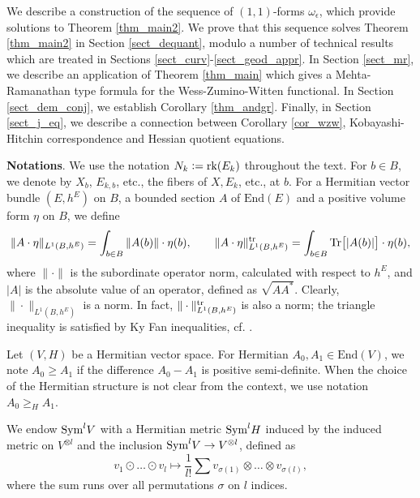 \documentclass[12pt]{article}
\numberwithin{equation}{section}
\theoremstyle{theorem}
\theoremstyle{definition}
\theoremstyle{remark}
\newcommand{\enmr}[1]{\text{End}{(#1)}}
\newcommand{\rk}[1]{{\rm{rk}} ( #1 )}
\newcommand{\tr}[1]{{\rm{Tr}} \big[ #1 \big]}
\begin{document}
	We describe a construction of the sequence of $(1, 1)$-forms $\omega_{\epsilon}$, which provide solutions to Theorem \ref{thm_main2}.
	We prove that this sequence solves Theorem \ref{thm_main2} in Section \ref{sect_dequant}, modulo a number of technical results which are treated in Sections \ref{sect_curv}-\ref{sect_geod_appr}.
	In Section \ref{sect_mr}, we describe an application of Theorem \ref{thm_main} which gives a Mehta-Ramanathan type formula for the Wess-Zumino-Witten functional.
	In Section \ref{sect_dem_conj}, we establish Corollary \ref{thm_andgr}. 
	Finally, in Section \ref{sect_j_eq}, we describe a connection between Corollary \ref{cor_wzw}, Kobayashi-Hitchin correspondence and Hessian quotient equations.
	\par 
	\textbf{Notations}. 
	We use the notation $N_k := \rk{E_k}$ throughout the text. 
	For $b \in B$, we denote by $X_b$, $E_{k, b}$, etc., the fibers of $X, E_k$, etc., at $b$. 
	For a Hermitian vector bundle $(E, h^E)$ on $B$, a bounded section $A$ of $\enmr{E}$ and a positive volume form $\eta$ on $B$, we define
	\begin{equation}
		\| A \cdot \eta \|_{L^1(B, h^E)} = \int_{b \in B} \| A(b) \| \cdot \eta(b), 
		\qquad 
		\| A \cdot \eta \|_{L^1(B, h^E)}^{{\rm{tr}}} = \int_{b \in B} \tr{|A(b)|} \cdot \eta(b),
	\end{equation}
	where $\| \cdot \|$ is the subordinate operator norm, calculated with respect to $h^E$, and $|A|$ is the absolute value of an operator, defined as $\sqrt{A A^*}$.
	Clearly, $\| \cdot \|_{L^1(B, h^E)}$ is a norm. 
	In fact, $\| \cdot \|_{L^1(B, h^E)}^{{\rm{tr}}}$ is also a norm; the triangle inequality is satisfied by Ky Fan inequalities, cf. \cite[Exercise II.1.15]{BhatiaMatr}.
	\par 
	Let $(V, H)$ be a Hermitian vector space.
	For Hermitian $A_0, A_1 \in \enmr{V}$, we note $A_0 \geq A_1$ if the difference $A_0 - A_1$ is positive semi-definite.
	When the choice of the Hermitian structure is not clear from the context, we use notation $A_0 \geq_H A_1$. 
	\par 
	We endow ${\rm{Sym}}^l V$ with a Hermitian metric ${\rm{Sym}}^l H$ induced by the induced metric on $V^{\otimes l}$ and the inclusion ${\rm{Sym}}^l V \to V^{\otimes l}$, defined as
	\begin{equation}\label{eq_sym_emb_tens}
		v_1 \odot \ldots \odot v_l \mapsto \frac{1}{l!} \sum v_{\sigma(1)} \otimes \ldots \otimes v_{\sigma(l)},
	\end{equation}
	where the sum runs over all permutations $\sigma$ on $l$ indices.
\end{document}
